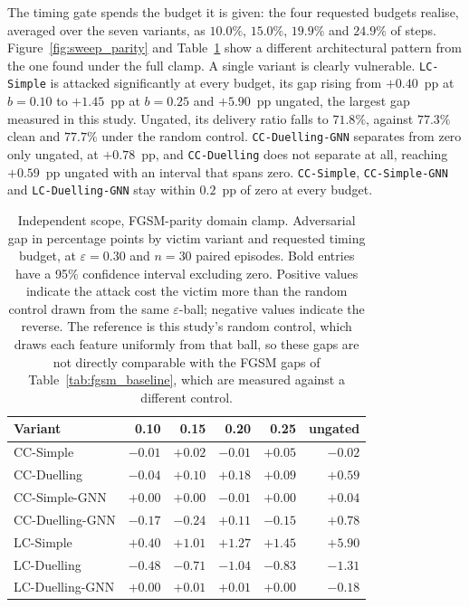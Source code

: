 The timing gate spends the budget it is given: the four requested budgets realise,
averaged over the seven variants, as $10.0\%$, $15.0\%$, $19.9\%$ and $24.9\%$ of
steps. Figure~\ref{fig:sweep_parity} and Table~\ref{tab:gap_sweep_parity} show a
different architectural pattern from the one found under the full clamp. A single
variant is clearly vulnerable. \texttt{LC-Simple} is attacked significantly at every
budget, its gap rising from $+0.40$~pp at $b = 0.10$ to $+1.45$~pp at $b = 0.25$ and
$+5.90$~pp ungated, the largest gap measured in this study. Ungated, its delivery ratio
falls to $71.8\%$, against $77.3\%$ clean and $77.7\%$ under the random control.
\texttt{CC-Duelling-GNN} separates from zero only ungated, at $+0.78$~pp, and
\texttt{CC-Duelling} does not separate at all, reaching $+0.59$~pp ungated with an
interval that spans zero. \texttt{CC-Simple}, \texttt{CC-Simple-GNN} and
\texttt{LC-Duelling-GNN} stay within $0.2$~pp of zero at every budget.

\begin{table}[htbp]
  \centering
  \caption[Independent scope, FGSM-parity clamp: adversarial gap by timing budget]{%
           Independent scope, FGSM-parity domain clamp. Adversarial gap in percentage
           points by victim variant and requested timing budget, at
           $\varepsilon = 0.30$ and $n = 30$ paired episodes. Bold entries have a 95\%
           confidence interval excluding zero. Positive values indicate the attack
           cost the victim more than the random control drawn from the same
           $\varepsilon$-ball; negative values indicate the reverse. The reference is
           this study's random control, which draws each feature uniformly from that
           ball, so these gaps are not directly comparable with the FGSM gaps of
           Table~\ref{tab:fgsm_baseline}, which are measured against a different
           control.}
  \label{tab:gap_sweep_parity}
  \begin{tabular}{lrrrrr}
    \hline
    \textbf{Variant} & \textbf{0.10} & \textbf{0.15} & \textbf{0.20} & \textbf{0.25} & \textbf{ungated} \\
    \hline
    CC-Simple        & $-0.01$ & $+0.02$ & $-0.01$ & $+0.05$ & $-0.02$ \\
    CC-Duelling      & $-0.04$ & $+0.10$ & $+0.18$ & $+0.09$ & $+0.59$ \\
    CC-Simple-GNN    & $+0.00$ & $+0.00$ & $-0.01$ & $+0.00$ & $+0.04$ \\
    CC-Duelling-GNN  & $-0.17$ & $-0.24$ & $+0.11$ & $-0.15$ & $\mathbf{+0.78}$ \\
    LC-Simple        & $\mathbf{+0.40}$ & $\mathbf{+1.01}$ & $\mathbf{+1.27}$ & $\mathbf{+1.45}$ & $\mathbf{+5.90}$ \\
    LC-Duelling      & $\mathbf{-0.48}$ & $\mathbf{-0.71}$ & $\mathbf{-1.04}$ & $\mathbf{-0.83}$ & $\mathbf{-1.31}$ \\
    LC-Duelling-GNN  & $+0.00$ & $+0.01$ & $+0.01$ & $+0.00$ & $-0.18$ \\
    \hline
  \end{tabular}
\end{table}

